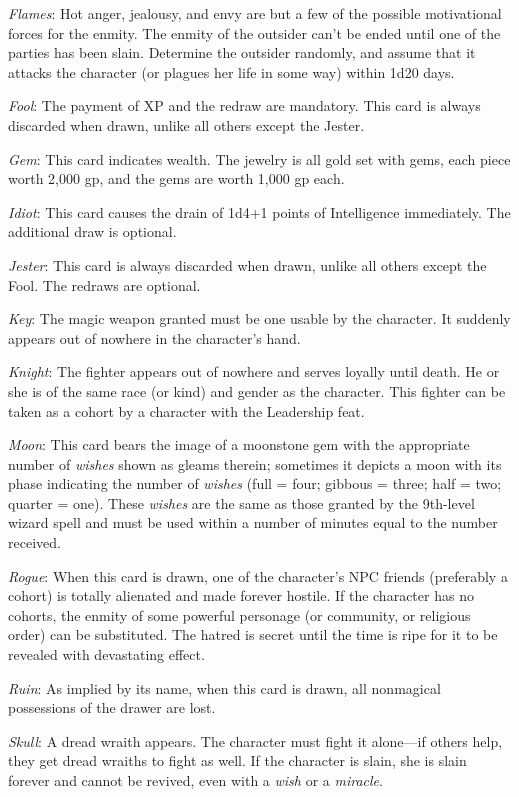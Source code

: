 \textit{Flames}: Hot anger, jealousy, and envy are but a few of the possible motivational forces for the enmity. The enmity of the outsider can't be ended until one of the parties has been slain. Determine the outsider randomly, and assume that it attacks the character (or plagues her life in some way) within 1d20 days.
				
\textit{Fool}: The payment of XP and the redraw are mandatory. This card is always discarded when drawn, unlike all others except the Jester.
				
\textit{Gem}: This card indicates wealth. The jewelry is all gold set with gems, each piece worth 2,000 gp, and the gems are worth 1,000 gp each. 
				
\textit{Idiot}: This card causes the drain of 1d4+1 points of Intelligence immediately. The additional draw is optional.
				
\textit{Jester}: This card is always discarded when drawn, unlike all others except the Fool. The redraws are optional.
				
\textit{Key}: The magic weapon granted must be one usable by the character. It suddenly appears out of nowhere in the character's hand.
				
\textit{Knight}: The fighter appears out of nowhere and serves loyally until death. He or she is of the same race (or kind) and gender as the character. This fighter can be taken as a cohort by a character with the Leadership feat.
				
\textit{Moon}: This card bears the image of a moonstone gem with the appropriate number of \textit{wishes }shown as gleams therein; sometimes it depicts a moon with its phase indicating the number of \textit{wishes }(full = four; gibbous = three; half = two; quarter = one). These \textit{wishes }are the same as those granted by the 9th-level wizard spell and must be used within a number of minutes equal to the number received.
				
\textit{Rogue}: When this card is drawn, one of the character's NPC friends (preferably a cohort) is totally alienated and made forever hostile. If the character has no cohorts, the enmity of some powerful personage (or community, or religious order) can be substituted. The hatred is secret until the time is ripe for it to be revealed with devastating effect.
				
\textit{Ruin}: As implied by its name, when this card is drawn, all nonmagical possessions of the drawer are lost.
				
\textit{Skull}: A dread wraith appears. The character must fight it alone---if others help, they get dread wraiths to fight as well. If the character is slain, she is slain forever and cannot be revived, even with a \textit{wish }or a \textit{miracle}.
				
